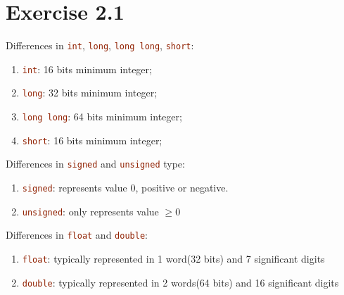 \documentclass{article}
\begin{document}
\section*{Exercise 2.1}

Differences in \lstinline[language=C++]|int|, \lstinline[language=C++]|long|, \lstinline[language=C++]|long long|, \lstinline[language=C++]|short|:

\begin{enumerate}
    \item \lstinline[language=C++]|int|: 16 bits minimum integer;
    \item \lstinline[language=C++]|long|: 32 bits minimum integer;
    \item \lstinline[language=C++]|long long|: 64 bits minimum integer;
    \item \lstinline[language=C++]|short|: 16 bits minimum integer;
\end{enumerate}

\begin{flushleft}
Differences in \lstinline[language=C++]|signed| and \lstinline[language=C++]|unsigned| type:
\end{flushleft}

\begin{enumerate}
    \item \lstinline[language=C++]|signed|: represents value 0, positive or negative.
    \item \lstinline[language=C++]|unsigned|: only represents value $\ge 0$
\end{enumerate}

\begin{flushleft}
Differences in \lstinline[language=C++]|float| and \lstinline[language=C++]|double|:
\end{flushleft}

\begin{enumerate}
    \item \lstinline[language=C++]|float|: typically represented in 1 word(32 bits) and 7 significant digits
    \item \lstinline[language=C++]|double|: typically represented in 2 words(64 bits) and 16 significant digits
\end{enumerate}
\end{document}
